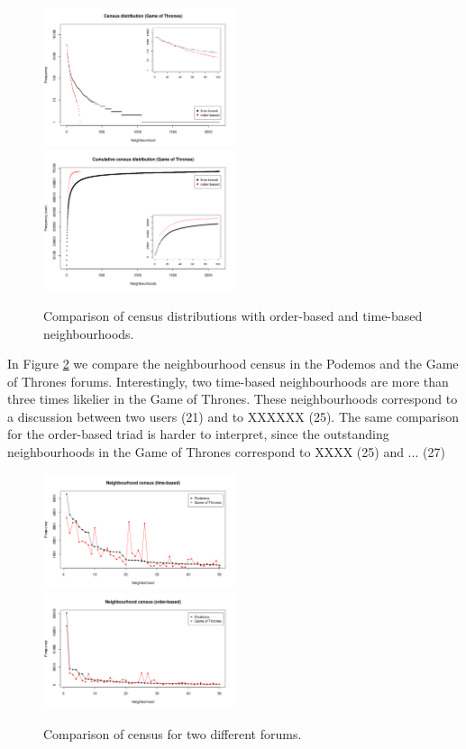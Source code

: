 \documentclass[conference]{IEEEtran}
\begin{document}
\begin{figure}
\centering
\includegraphics[width=0.5\textwidth]{order_vs_time_census_distribution}%
\includegraphics[width=0.5\textwidth]{order_vs_time_census_distribution_cum}
\caption{Comparison of census distributions with order-based and time-based neighbourhoods.}
\label{fig:census_distributions}
\end{figure}


In Figure \ref{fig:census_compare} we compare the neighbourhood census in the Podemos and the Game of Thrones forums. Interestingly, two time-based neighbourhoods are  more than three times likelier in the Game of Thrones. These neighbourhoods correspond to a discussion between two users (21) and to XXXXXX (25). The same comparison for the order-based triad is harder to interpret, since the outstanding neighbourhoods in the Game of Thrones correspond to XXXX (25) and ... (27)


\begin{figure}
\centering
\includegraphics[width=0.5\textwidth]{time_neighbourhood_census_compare_forums}%
\includegraphics[width=0.5\textwidth]{order_neighbourhood_census_compare_forums}
\caption{Comparison of census for two different forums.}
\label{fig:census_compare}
\end{figure}
\end{document}
